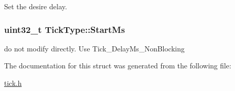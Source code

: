 Set the desire delay. 

\hypertarget{struct_tick_type_ab5d0b8e09de5ccc9e44a9b261916bdd2}{
\subsubsection[{Start\-Ms}]{\setlength{\rightskip}{0pt plus 5cm}uint32\-\_\-t Tick\-Type\-::\-Start\-Ms}}\label{struct_tick_type_ab5d0b8e09de5ccc9e44a9b261916bdd2}


do not modify directly. Use Tick\-\_\-\-Delay\-Ms\-\_\-\-Non\-Blocking 



The documentation for this struct was generated from the following file\-:\begin{DoxyCompactItemize}
\item 
\hyperlink{tick_8h}{tick.\-h}\end{DoxyCompactItemize}
